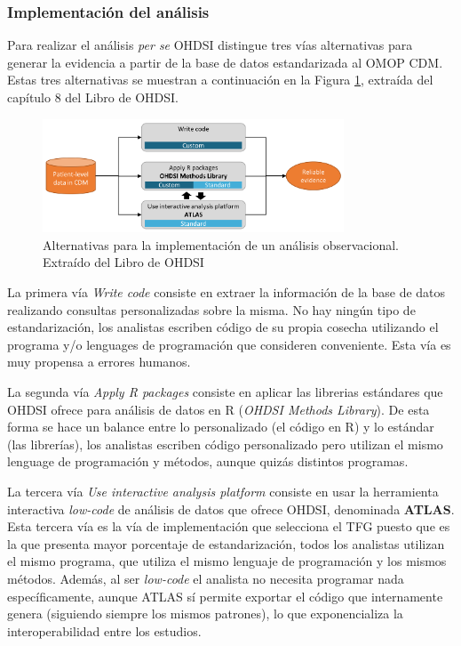 \subsubsection{Implementación del análisis}

Para realizar el análisis \textit{per se} OHDSI distingue tres vías alternativas para generar la evidencia a partir de la base de datos estandarizada al OMOP CDM. Estas tres alternativas se muestran a continuación en la Figura \ref{fig:analysisImplementations }, extraída del capítulo 8 del Libro de OHDSI.

\begin{figure}[H]
    \centering
    \includegraphics[width=0.80\textwidth]{figures/analysisImplementations.png}
     \caption{Alternativas para la implementación de un análisis observacional. Extraído del Libro de OHDSI \cite{OHDSIbook}}
    \label{fig:analysisImplementations }
\end{figure}

La primera vía \textit{Write code} consiste en extraer la información de la base de datos realizando consultas personalizadas sobre la misma. No hay ningún tipo de estandarización, los analistas escriben código de su propia cosecha utilizando el programa y/o lenguages de programación que consideren conveniente. Esta vía es muy propensa a errores humanos.

La segunda vía \textit{Apply R packages} consiste en aplicar las librerias estándares que OHDSI ofrece para análisis de datos en R (\textit{OHDSI Methods Library}). De esta forma se hace un balance entre lo personalizado (el código en R) y lo estándar (las librerías), los analistas escriben código personalizado pero utilizan el mismo lenguage de programación y métodos, aunque quizás distintos programas.

La tercera vía \textit{Use interactive analysis platform} consiste en usar la herramienta interactiva \textit{low-code} de análisis de datos que ofrece OHDSI, denominada \textbf{ATLAS}. Esta tercera vía es la vía de implementación que selecciona el TFG puesto que es la que presenta mayor porcentaje de estandarización, todos los analistas utilizan el mismo programa, que utiliza el mismo lenguaje de programación y los mismos métodos. Además, al ser \textit{low-code} el analista no necesita programar nada específicamente, aunque ATLAS sí permite exportar el código que internamente genera (siguiendo siempre los mismos patrones), lo que exponencializa la interoperabilidad entre los estudios.

